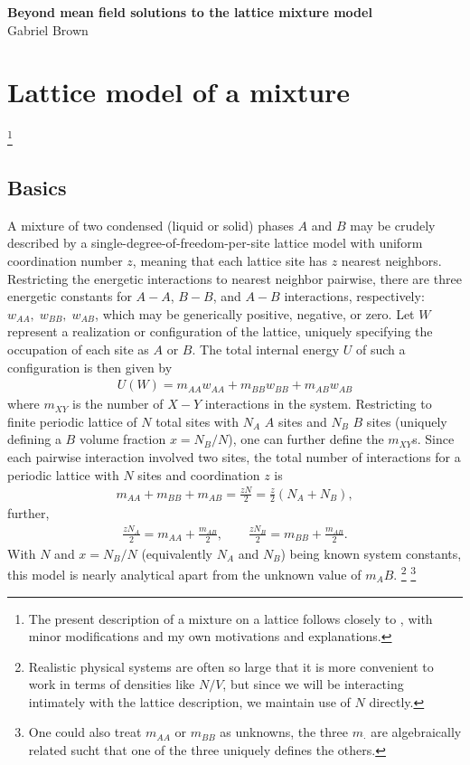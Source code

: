 \documentclass[10pt]{article}
\begin{document}
\begin{center}
    \textbf{\large Beyond mean field solutions to the lattice mixture model} \\
    Gabriel Brown
\end{center}

%

\section{Lattice model of a mixture} \footnote{The present description of a mixture on a lattice follows closely to \cite{dill}, with minor modifications and my own motivations and explanations.} 
\subsection{Basics}
A mixture of two condensed (liquid or solid) phases $A$ and $B$ may be crudely described by a single-degree-of-freedom-per-site lattice model with uniform coordination number $z$, meaning that each lattice site has $z$ nearest neighbors.
Restricting the energetic interactions to nearest neighbor pairwise, there are three energetic constants for $A-A$, $B-B$, and $A-B$ interactions, respectively: $w_{AA}, \; w_{BB}, \; w_{AB}$, which may be generically positive, negative, or zero.
Let $W$ represent a realization or configuration of the lattice, uniquely specifying the occupation of each site as $A$ or $B$.
The total internal energy $U$ of such a configuration is then given by
\begin{align}
    U(W) = m_{AA} w_{AA} + m_{BB} w_{BB} + m_{AB} w_{AB}
\end{align}
where $m_{XY}$ is the number of $X-Y$ interactions in the system.
Restricting to finite periodic lattice of $N$ total sites with $N_A$ $A$ sites and $N_B$ $B$ sites (uniquely defining a $B$ volume fraction $x = N_B / N$), one can further define the $m_{XY}$s.
Since each pairwise interaction involved two sites, the total number of interactions for a periodic lattice with $N$ sites and coordination $z$ is
\begin{align}
    m_{AA} + m_{BB} + m_{AB} = \frac{z N}{2} = \frac{z}{2} \left( N_A + N_B \right),
\end{align}
further,
\begin{align}
    \frac{z N_A}{2} = m_{AA} + \frac{m_{AB}}{2}, \quad\quad
    \frac{z N_B}{2} = m_{BB} + \frac{m_{AB}}{2}.
\end{align}
With $N$ and $x=N_B/N$ (equivalently $N_A$ and $N_B$) being known system constants, this model is nearly analytical apart from the unknown value of $m_AB$. \footnote{Realistic physical systems are often so large that it is more convenient to work in terms of densities like $N/V$, but since we will be interacting intimately with the lattice description, we maintain use of $N$ directly.} \footnote{One could also treat $m_{AA}$ or $m_{BB}$ as unknowns, the three $m_{\cdot}$ are algebraically related sucht that one of the three uniquely defines the others.}
\end{document}
